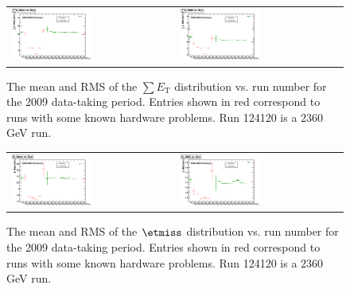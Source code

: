 \begin{figure}[h!]
  \centering
  \begin{tabular}{ll}
    \includegraphics[width=0.5\textwidth]{plots_METStability/h_caloSumetMean_vs_run.eps} &
    \includegraphics[width=0.5\textwidth]{plots_METStability/h_caloSumetRMS_vs_run.eps} \\
  \end{tabular}
 \caption{\small The mean and RMS of the $\sum E_\text{T}$ distribution vs. run number for the 2009 data-taking period.
          Entries shown in red correspond to runs with some known hardware problems. Run 124120 is a $2360$ GeV run.
          \label{fig:SumET_vs_run}}
      \end{figure}

\begin{figure}[h!]
  \centering
  \begin{tabular}{ll}
    \includegraphics[width=0.5\textwidth]{plots_METStability/h_calometPtMean_vs_run.eps} &
    \includegraphics[width=0.5\textwidth]{plots_METStability/h_calometPtRMS_vs_run.eps} \\
  \end{tabular}
  \caption{\small The mean and RMS of the $\etmiss$ distribution vs. run
    number for the 2009 data-taking period.  Entries shown in red
    correspond to runs with some known hardware problems. Run 124120 is a $2360$ GeV run.\label{fig:MET_vs_run}}
\end{figure}

